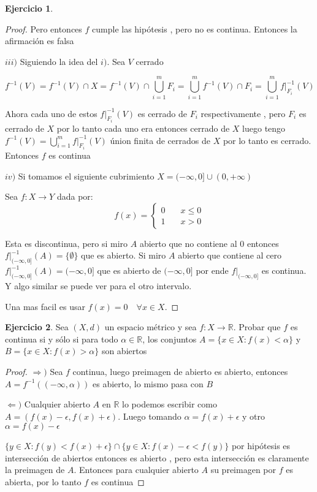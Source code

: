 \documentclass[12pt]{article}
\newcommand{\R}{\mathbb{R}}
\newcommand{\Ra}{\Rightarrow}
\newcommand{\ra}{\rightarrow}
\theoremstyle{definition}
\newtheorem{ej}{Ejercicio}
\begin{document}
\begin{ej}
\begin{proof}
Pero entonces $f$ cumple las hipótesis , pero no es continua. Entonces la afirmación es falsa

$iii)$ Siguiendo la idea del $i)$. Sea $V$ cerrado

$$ f^{-1}(V) = f^{-1}(V) \cap X = f^{-1}(V) \cap \bigcup_{i = 1}^m  F_i = \bigcup_{i = 1}^m f^{-1}(V) \cap F_i = \bigcup_{i =1}^m f|_{F_i}^{-1}(V)$$

Ahora cada uno de estos $f|_{F_i}^{-1} (V)$ es cerrado de $F_i$ respectivamente , pero $F_i$ es cerrado de $X$ por lo tanto cada uno era entonces cerrado de $X$ luego tengo $f^{-1}(V) = \bigcup_{i =1}^m f|_{F_i}^{-1}(V) $ únion finita de cerrados de $X$ por lo tanto es cerrado. Entonces $f$ es continua

$iv)$ Si tomamos el siguiente cubrimiento $X = (-\infty,0] \cup (0,+\infty)$  

Sea $f: X \ra Y$ dada por:
$$
f(x) = \left\{
        \begin{array}{ll}
            0 & \quad x \leq 0 \\
            1 & \quad x > 0
        \end{array}
    \right.
$$

Esta es discontinua, pero si miro $A$ abierto que no contiene al $0$ entonces $f|_{(-\infty , 0]}^{-1}(A) = \{\emptyset\}$ que es abierto. Si miro $A$ abierto que contiene al cero $f|_{(-\infty , 0]}^{-1}(A) = (-\infty,0]$ que es abierto de $(-\infty,0]$ por ende $f|_{(-\infty,0]}$ es continua. Y algo similar se puede ver para el otro intervalo.

Una mas facil es usar $f(x) = 0 \quad \forall x \in X$.

\end{proof}
 \end{ej}
 \begin{ej}
   Sea $(X,d)$ un espacio métrico y sea $f: X \ra \R.$ Probar que $f$ es continua si y sólo si para todo $\alpha \in \R$, los conjuntos $A = \{x \in X : f(x) < \alpha \}$ y $B = \{x \in X : f(x) > \alpha\}$ son abiertos
   \begin{proof}
   $\Ra )$ Sea $f$ continua, luego preimagen de abierto es abierto, entonces $A = f^{-1}((- \infty,\alpha))$ es abierto, lo mismo pasa con $B$

 $\Leftarrow )$ Cualquier abierto $A$ en $\R$ lo podemos escribir como $A = (f(x)-\epsilon,f(x)+\epsilon)$. Luego tomando $\alpha = f(x) + \epsilon$ y otro $\alpha = f(x) - \epsilon$

 $\{y \in X : f(y) < f(x) + \epsilon\} \cap \{ y \in X : f(x) - \epsilon <f(y)\}$ por hipótesis es intersección de abiertos entonces es abierto , pero esta intersección es claramente la preimagen de $A$. Entonces para cualquier abierto $A$ su preimagen por $f$ es abierta, por lo tanto $f$ es continua
   \end{proof}
 \end{ej}
\end{document}
